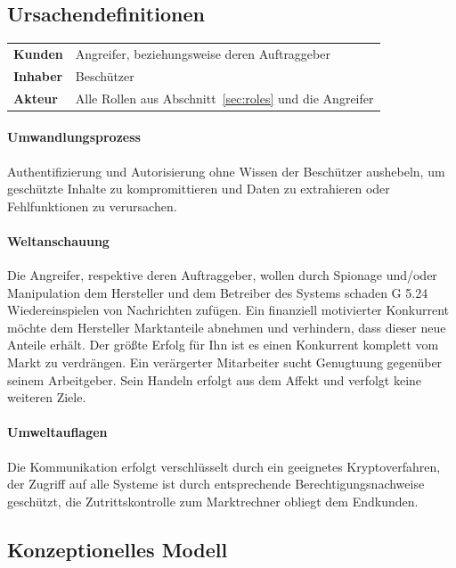 \documentclass[11pt,a4paper]{report}
\begin{document}
\subsection{Ursachendefinitionen}

\begin{table}[h] %
\begin{tabularx}{\linewidth}{@{}lX@{}}
\textbf{Kunden} & Angreifer, beziehungsweise deren Auftraggeber\\
\textbf{Inhaber} & Beschützer\\
\textbf{Akteur} & Alle Rollen aus Abschnitt~\ref{sec:roles} und die Angreifer\\
\end{tabularx}
\end{table}

\paragraph{Umwandlungsprozess} Authentifizierung und Autorisierung ohne Wissen der Beschützer aushebeln, um geschützte Inhalte zu kompromittieren und Daten zu extrahieren oder Fehlfunktionen zu verursachen.

\paragraph{Weltanschauung} Die Angreifer, respektive deren Auftraggeber, wollen durch Spionage und/oder Manipulation dem Hersteller und dem
Betreiber des Systems schaden G 5.24 Wiedereinspielen von Nachrichten  zufügen. Ein finanziell motivierter Konkurrent möchte dem Hersteller Marktanteile abnehmen und verhindern, dass dieser neue Anteile erhält. Der größte Erfolg für Ihn ist es einen Konkurrent komplett vom Markt zu verdrängen. Ein verärgerter Mitarbeiter sucht Genugtuung gegenüber seinem Arbeitgeber. Sein Handeln erfolgt aus dem Affekt und verfolgt keine weiteren Ziele.

\paragraph{Umweltauflagen} Die Kommunikation erfolgt verschlüsselt durch ein geeignetes Kryptoverfahren, der Zugriff auf alle Systeme ist durch entsprechende Berechtigungsnachweise geschützt, die Zutrittskontrolle zum Marktrechner obliegt dem Endkunden.

\subsection{Konzeptionelles Modell}
\end{document}
